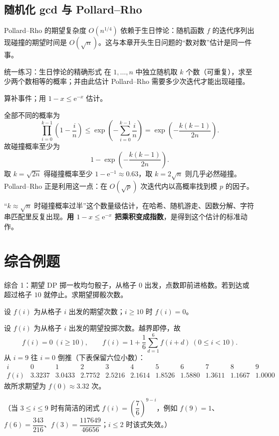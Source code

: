 \subsection{随机化 gcd 与 Pollard--Rho}
Pollard--Rho 的期望复杂度 $O(n^{1/4})$ 依赖于生日悖论：随机函数 $f$ 的迭代序列出现碰撞的期望时间是 $O(\sqrt{n})$。这与本章开头生日问题的“数对数”估计是同一件事。

\begin{problem}{统一练习：生日悖论的精确形式}
在 $1,\ldots,n$ 中独立随机取 $k$ 个数（可重复），求至少两个数相等的概率；并由此估计 Pollard--Rho 需要多少次迭代才能出现碰撞。
\end{problem}
\hint 算补事件；用 $1-x\le\mathrm e^{-x}$ 估计。

\sol 全部不同的概率为
\[
\prod_{i=0}^{k-1}\left(1-\frac in\right)
\le\exp\left(-\sum_{i=0}^{k-1}\frac in\right)
=\exp\left(-\frac{k(k-1)}{2n}\right).
\]
故碰撞概率至少为
\[
1-\exp\left(-\frac{k(k-1)}{2n}\right).
\]
取 $k=\sqrt{2n}$ 得碰撞概率至少 $1-\mathrm e^{-1}\approx0.63$，取 $k=2\sqrt n$ 则几乎必然碰撞。Pollard--Rho 正是利用这一点：在 $O(\sqrt p)$ 次迭代内以高概率找到模 $p$ 的因子。

\begin{teach}[把生日问题背下来是值得的]
“$k\approx\sqrt n$ 时碰撞概率过半”这个数量级估计，在哈希、随机游走、因数分解、字符串匹配里反复出现。\textbf{用 $1-x\le\mathrm e^{-x}$ 把乘积变成指数}，是得到这个估计的标准动作。
\end{teach}

\section{综合例题}
\begin{problem}{综合 1：期望 DP}
掷一枚均匀骰子，从格子 $0$ 出发，点数即前进格数。若到达或超过格子 $10$ 就停止。求期望掷骰次数。
\end{problem}
\hint 设 $f(i)$ 为从格子 $i$ 出发的期望次数；$i\ge10$ 时 $f(i)=0$。

\sol 设 $f(i)$ 为从格子 $i$ 出发的期望投掷次数。越界即停，故
\[
f(i)=0\ (i\ge10),\qquad
f(i)=1+\frac16\sum_{d=1}^{6}f(i+d)\ (0\le i<10).
\]
从 $i=9$ 往 $i=0$ 倒推（下表保留六位小数）：
\[
\begin{array}{c|cccccccccc}
i&0&1&2&3&4&5&6&7&8&9\\\hline
f(i)&3.3237&3.0433&2.7752&2.5216&2.1614&1.8526&1.5880&1.3611&1.1667&1.0000
\end{array}
\]
故所求期望为 $f(0)\approx3.32$ 次。

（当 $3\le i\le9$ 时有简洁的闭式 $f(i)=\left(\dfrac76\right)^{9-i}$，例如 $f(9)=1$、$f(6)=\dfrac{343}{216}$、$f(3)=\dfrac{117649}{46656}$；$i\le2$ 时该式失效。）

